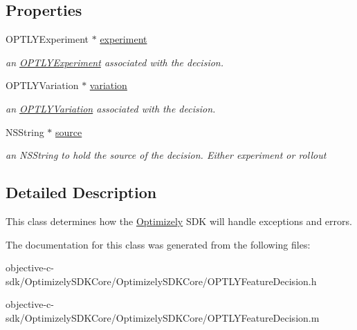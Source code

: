\subsection*{Properties}
\begin{DoxyCompactItemize}
\item 
\mbox{\label{interface_o_p_t_l_y_feature_decision_a80f7caf6967c458baf2c0106953c8f38}} 
O\+P\+T\+L\+Y\+Experiment $\ast$ \mbox{\hyperlink{interface_o_p_t_l_y_feature_decision_a80f7caf6967c458baf2c0106953c8f38}{experiment}}
\begin{DoxyCompactList}\small\item\em an \mbox{\hyperlink{protocol_o_p_t_l_y_experiment-p}{O\+P\+T\+L\+Y\+Experiment}} associated with the decision. \end{DoxyCompactList}\item 
\mbox{\label{interface_o_p_t_l_y_feature_decision_a7a98d61c78c79ca122ccfb9e1db61779}} 
O\+P\+T\+L\+Y\+Variation $\ast$ \mbox{\hyperlink{interface_o_p_t_l_y_feature_decision_a7a98d61c78c79ca122ccfb9e1db61779}{variation}}
\begin{DoxyCompactList}\small\item\em an \mbox{\hyperlink{protocol_o_p_t_l_y_variation-p}{O\+P\+T\+L\+Y\+Variation}} associated with the decision. \end{DoxyCompactList}\item 
\mbox{\label{interface_o_p_t_l_y_feature_decision_a95745d1d33a50f44ee9a8a4e48b7ac93}} 
N\+S\+String $\ast$ \mbox{\hyperlink{interface_o_p_t_l_y_feature_decision_a95745d1d33a50f44ee9a8a4e48b7ac93}{source}}
\begin{DoxyCompactList}\small\item\em an N\+S\+String to hold the source of the decision. Either experiment or rollout \end{DoxyCompactList}\end{DoxyCompactItemize}


\subsection{Detailed Description}
This class determines how the \mbox{\hyperlink{interface_optimizely}{Optimizely}} S\+DK will handle exceptions and errors. 

The documentation for this class was generated from the following files\+:\begin{DoxyCompactItemize}
\item 
objective-\/c-\/sdk/\+Optimizely\+S\+D\+K\+Core/\+Optimizely\+S\+D\+K\+Core/O\+P\+T\+L\+Y\+Feature\+Decision.\+h\item 
objective-\/c-\/sdk/\+Optimizely\+S\+D\+K\+Core/\+Optimizely\+S\+D\+K\+Core/O\+P\+T\+L\+Y\+Feature\+Decision.\+m\end{DoxyCompactItemize}
